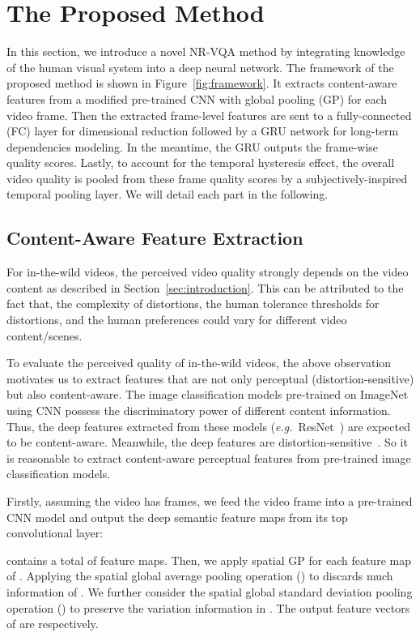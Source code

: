 \documentclass[sigconf]{acmart}
\begin{document}
\section{The Proposed Method}
\label{sec:framework}
In this section, we introduce a novel NR-VQA method by integrating knowledge of the human visual system into a deep neural network.
The framework of the proposed method is shown in Figure~\ref{fig:framework}.
It extracts content-aware features from a modified pre-trained CNN with global pooling (GP) for each video frame. 
Then the extracted frame-level features are sent to a fully-connected (FC) layer for dimensional reduction followed by a GRU network for long-term dependencies modeling. 
In the meantime, the GRU outputs the frame-wise quality scores. Lastly, to account for the temporal hysteresis effect, the overall video quality is pooled from these frame quality scores by a subjectively-inspired temporal pooling layer. We will detail each part in the following.

\subsection{Content-Aware Feature Extraction}
For in-the-wild videos, the perceived video quality strongly depends on the video content as described in Section~\ref{sec:introduction}. 
This can be attributed to the fact that, the complexity of distortions, the human tolerance thresholds for distortions, and the human preferences could vary for different video content/scenes.

To evaluate the perceived quality of in-the-wild videos, the above observation motivates us to extract features that are not only perceptual (distortion-sensitive) but also content-aware.
The image classification models pre-trained on ImageNet~\cite{deng2009imagenet} using CNN possess the discriminatory power of different content information.
Thus, the deep features extracted from these models (\textit{e.g.}~ResNet~\cite{he2016deep}) are expected to be content-aware. 
Meanwhile, the deep features are distortion-sensitive~\cite{dodge2016understanding}. 
So it is reasonable to extract content-aware perceptual features from pre-trained image classification models.

Firstly, assuming the video has  frames, we feed the video frame  into a pre-trained CNN model and output the deep semantic feature maps  from its top convolutional layer:


 contains a total of  feature maps.
Then, we apply spatial GP for each feature map of . 
Applying the spatial global average pooling operation () to  discards much information of . 
We further consider the spatial global standard deviation pooling operation () to preserve the variation information in . 
The output feature vectors of  are  respectively.
\end{document}
